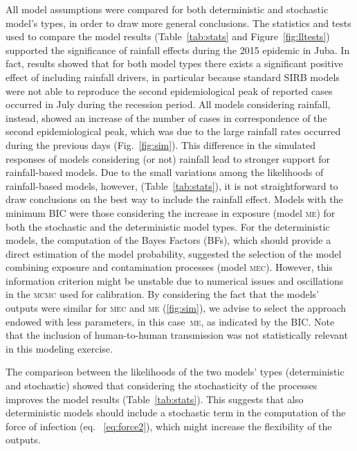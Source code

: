 All model assumptions were compared for both deterministic and stochastic model's types, in order to draw more general conclusions. The statistics and tests used to compare the model results  (Table~\ref{tab:stats} and Figure~\ref{fig:lltests}) supported the significance of rainfall effects during the 2015 epidemic in Juba. In fact, results showed that for both model types there exists a significant positive effect of including rainfall drivers, in particular because standard SIRB models were not able to reproduce the second epidemiological peak of reported cases occurred in July during the recession period. All models considering rainfall, instead, showed an increase of the number of cases in correspondence of the second epidemiological peak, which was due to the large rainfall rates occurred during the previous days (Fig.~\ref{fig:sim}). 
This difference in the simulated responses of models considering (or not) rainfall lead to stronger support for rainfall-based models. Due to the small variations among the likelihoods of rainfall-based models, however,  (Table~\ref{tab:stats}), it is not straightforward to draw conclusions on the best way to include the rainfall effect.
Models with the minimum BIC were those considering the increase in exposure (model \textsc{me}) for both the stochastic and the deterministic model types. For the deterministic models, the computation of the Bayes Factors (BFs), which should provide a direct estimation of the model probability, suggested the selection of the model combining exposure and contamination processes (model \textsc{mec}). However, this information criterion might be unstable due to numerical issues and oscillations in the \textsc{mcmc} used for calibration\cite{Raftery:EstimatingIntegratedLikelihood:2007}. By considering the fact that the models' outputs were similar for \textsc{mec} and \textsc{me} (\ref{fig:sim}), we advise to select the approach endowed with less parameters, in this case~\textsc{me}, as indicated by the BIC. Note that the inclusion of human-to-human transmission was not statistically relevant in this modeling exercise.

The comparison between the likelihoods of the two models' types (deterministic and stochastic) showed that considering the stochasticity of the processes improves the model results (Table~\ref{tab:stats}). This suggests that also deterministic models should include a stochastic term in the computation of the force of infection (eq. ~\ref{eq:force2}), which might increase the flexibility of the outputs.

